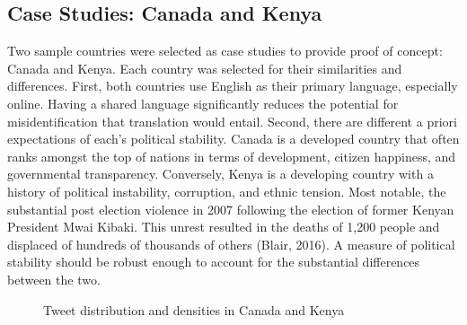 \documentclass[12pt]{article}
\begin{document}
\begin{spacing}{1.5}
\subsection*{Case Studies: Canada and Kenya}

Two sample countries were selected as case studies to provide proof of concept: Canada and Kenya. Each country was selected for their similarities and differences. First, both countries use English as their primary language, especially online. Having a shared language significantly reduces the potential for misidentification that translation would entail. Second, there are different a priori expectations of each’s political stability. Canada is a developed country that often ranks amongst the top of nations in terms of development, citizen happiness, and governmental transparency. Conversely, Kenya is a developing country with a history of political instability, corruption, and ethnic tension. Most notable, the substantial post election violence in 2007 following the election of former Kenyan President Mwai Kibaki. This unrest resulted in the deaths of 1,200 people and displaced of hundreds of thousands of others (Blair, 2016). A measure of political stability should be robust enough to account for the substantial differences between the two.  

\begin{figure}[htb]
\centering 
{}
\caption{Tweet distribution and densities in Canada and Kenya}
\end{figure}


\end{spacing}
\end{document}
